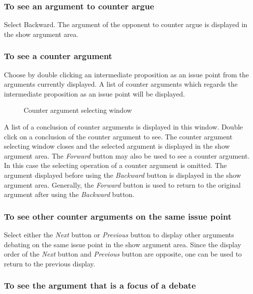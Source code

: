 \subsubsection{To see an argument to counter argue}

Select Backward.
The argument of the opponent to counter argue is displayed in the show argument area.

\subsubsection{To see a counter argument}

Choose by double clicking an intermediate proposition as an issue point from the arguments currently displayed.
A list of counter arguments which regards the intermediate proposition as an issue point will be displayed.

\begin{figure}[htb]
\begin{center}
\end{center}
\caption{Counter argument selecting window}
\end{figure}

A list of a conclusion of counter arguments is displayed in this window.
Double click on a conclusion of the counter argument to see.
The counter argument selecting window closes and the selected argument is displayed in the show argument area.
The {\sl Forward} button may also be used to see a counter argument.
In this case the selecting operation of a counter argument is omitted.
The argument displayed before using the {\sl Backward} button is displayed in the show argument area.
Generally, the {\sl Forward} button is used to return to the original
argument after using the {\sl Backward} button.

\subsubsection{To see other counter arguments on the same issue point}

Select either the {\sl Next} button or {\sl Previous} button to display other arguments debating on the same issue point in the show argument area.
Since the display order of the {\sl Next} button and {\sl Previous} button are opposite, one can be used to return to the previous display.

\subsubsection{To see the argument that is a focus of a debate}


